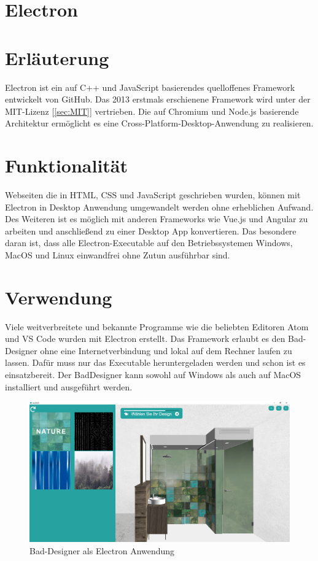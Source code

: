 \newpage
\clearpage

\section{Electron}\label{sec:Electron}
\cite{electron_doc}
\section*{Erläuterung}
Electron ist ein auf C++ und JavaScript basierendes quelloffenes Framework entwickelt von GitHub. Das 2013 erstmals erschienene Framework wird unter der MIT-Lizenz [\ref{sec:MIT}] vertrieben. Die auf Chromium und Node.js basierende Architektur ermöglicht es eine Cross-Platform-Desktop-Anwendung zu realisieren.

\section*{Funktionalität}
Webseiten die in HTML, CSS und JavaScript geschrieben wurden, können mit Electron in Desktop Anwendung umgewandelt werden ohne erheblichen Aufwand. Des Weiteren ist es möglich mit anderen Frameworks wie Vue.js und Angular zu arbeiten und anschließend zu einer Desktop App konvertieren. Das besondere daran ist, dass alle Electron-Executable auf den Betriebssystemen Windows, MacOS und Linux einwandfrei ohne Zutun ausführbar sind.


\section*{Verwendung}
Viele weitverbreitete und bekannte Programme wie die beliebten Editoren Atom und VS Code wurden mit Electron erstellt. Das Framework erlaubt es den Bad-Designer ohne eine Internetverbindung und lokal auf dem Rechner laufen zu lassen. Dafür muss nur das Executable heruntergeladen werden und schon ist es einsatzbereit. Der BadDesigner kann sowohl auf Windows als auch auf MacOS installiert und ausgeführt werden.
\begin{figure}[!b]
	\begin{center}
		\includegraphics[width=0.9\linewidth]{images/Electron_BD.png}
		\caption{Bad-Designer als Electron Anwendung}
	\end{center}
\end{figure}


